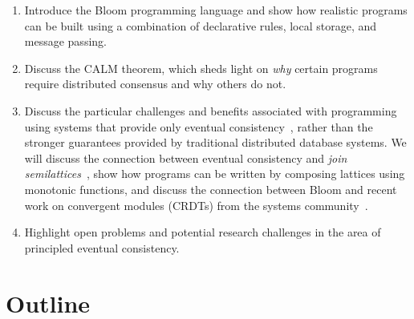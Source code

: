 \documentclass{sig-alternate}
\begin{document}
\begin{enumerate}
\item
  Introduce the Bloom programming language and show how realistic programs can
  be built using a combination of declarative rules, local storage, and message
  passing.
\item
  Discuss the CALM theorem, which sheds light on \emph{why} certain programs
  require distributed consensus and why others do not.
\item
  Discuss the particular challenges and benefits associated with programming
  using systems that provide only eventual
  consistency~\cite{DeCandia2007,Terry1995,vogels}, rather than the stronger
  guarantees provided by traditional distributed database systems. We will
  discuss the connection between eventual consistency and \emph{join
    semilattices}~\cite{Conway2012}, show how programs can be written by
  composing lattices using monotonic functions, and discuss the connection
  between Bloom and recent work on convergent modules (CRDTs) from the systems
  community~\cite{Shapiro2011a,Shapiro2011b}.
\item
  Highlight open problems and potential research challenges in the area of
  principled eventual consistency.
\end{enumerate}

\section{Outline}
\end{document}
